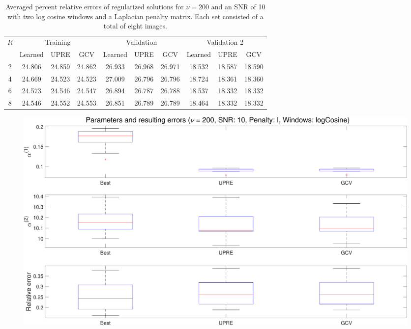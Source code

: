 \documentclass[12pt]{article}
\begin{document}
\begin{table}[ht!]
  \begin{center}
    \caption{Averaged percent relative errors of regularized solutions for $\nu = 200$ and an SNR of 10 with two log cosine windows and a Laplacian penalty matrix. Each set consisted of a total of eight images.}
    \label{tab:Relative Errors v200_SNR10_logCos2_L}
    \begin{tabular}{|c|c|c|c|c|c|c|c|c|c|}
    \hline
    \multirow{2}{*}{$R$} & \multicolumn{3}{|c|}{Training} & \multicolumn{3}{|c|}{Validation} & \multicolumn{3}{|c|}{Validation 2} \\
    \cline{2-10}
     & Learned & UPRE & GCV & Learned & UPRE & GCV & Learned & UPRE & GCV \\
    \hline
    2 & 24.806 & 24.859 & 24.862 & 26.933 & 26.968 & 26.971 & 18.532 & 18.587 & 18.590 \\
    \hline
    4 & 24.669 & 24.523 & 24.523 & 27.009 & 26.796 & 26.796 & 18.724 & 18.361 & 18.360\\
    \hline
    6 & 24.573 & 24.546 & 24.547 & 26.894 & 26.787 & 26.788 & 18.537 & 18.332 & 18.332 \\
    \hline
    8 & 24.546 & 24.552 & 24.553 & 26.851 & 26.789 & 26.789 & 18.464 & 18.332 & 18.332\\
    \hline
    \end{tabular}
  \end{center}
\end{table}


\begin{figure}[ht]
\centering
\includegraphics[width=1.0\textwidth]{Figures/Boxplot_v200_SNR10_logCos2_I.pdf}
\caption{}
\label{fig:Boxplot_v200_SNR10_logCos2_I}
\end{figure}
\end{document}
